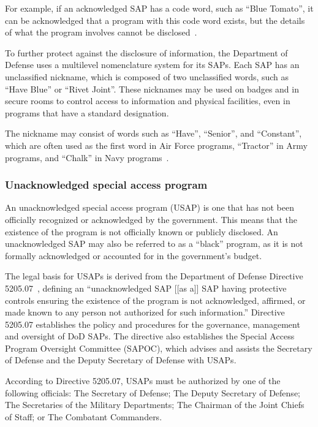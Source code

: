 For example, if an acknowledged SAP has a code word, such as ``Blue Tomato'', it can be acknowledged that a program with this code word exists, but the details of what the program involves cannot be disclosed~\cite{Dolan-MrX-Disclosure2020Jul}.

To further protect against the disclosure of information, the Department of Defense uses a multilevel nomenclature system for its SAPs. Each SAP has an unclassified nickname, which is composed of two unclassified words, such as ``Have Blue'' or ``Rivet Joint''. These nicknames may be used on badges and in secure rooms to control access to information and physical facilities, even in programs that have a standard designation.

The nickname may consist of words such as ``Have'', ``Senior'', and ``Constant'', which are often used as the first word in Air Force programs,
``Tractor'' in Army programs, and ``Chalk'' in Navy programs~\cite{Sweetman2000}.

\subsubsection{Unacknowledged special access program}

An unacknowledged special access program (USAP) is one that has not been officially recognized or acknowledged by the government. This means that the existence of the program is not officially known or publicly disclosed. An unacknowledged SAP may also be referred to as a ``black'' program, as it is not formally acknowledged or accounted for in the government's budget.

The legal basis for USAPs is derived from the Department of Defense Directive 5205.07~\cite{DODDirective5205.07}, defining
an ``unacknowledged SAP [[as a]]  SAP having protective controls ensuring the existence of the program
is not acknowledged, affirmed, or made known to any person not authorized for such  information.''
Directive 5205.07 establishes the policy and procedures for the governance, management and oversight of DoD SAPs.
The directive also establishes the Special Access Program Oversight Committee (SAPOC),
which advises and assists the Secretary of Defense and the Deputy Secretary of Defense with USAPs.

According to Directive 5205.07, USAPs must be authorized by one of the following officials:
The Secretary of Defense; The Deputy Secretary of Defense; The Secretaries of the Military Departments; The Chairman of the Joint Chiefs of Staff; or The Combatant Commanders.


